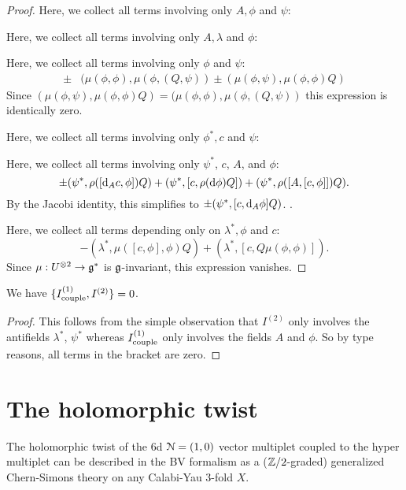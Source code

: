 \documentclass[10pt, oneside]{article}
\begin{document}
\begin{proof}
Here, we collect all terms involving only $A, \phi$ and $\psi$:

Here, we collect all terms involving only $A, \lambda$ and $\phi$:

Here, we collect all terms involving only $\phi$ and $\psi$:
\begin{align*}
\pm & (\mu(\phi, \phi) , \mu(\phi, (Q, \psi)) \pm (\mu(\phi, \psi), \mu(\phi,\phi)Q)
\end{align*}
Since $(\mu(\phi, \psi), \mu(\phi,\phi)Q) = (\mu(\phi, \phi) , \mu(\phi, (Q, \psi))$ this expression is identically zero. 

Here, we collect all terms involving only $\phi^*, c$ and $\psi$:


Here, we collect all terms involving only $\psi^*$, $c$, $A$, and $\phi$:
\[
\pm (\psi^*, \rho([{\rm d}_A c, \phi]) Q) + (\psi^*, [c, \rho({\rm d} \phi) Q]) + (\psi^*, \rho([A,[c,\phi]]) Q) .
\]
By the Jacobi identity, this simplifies to $\pm(\psi^*, [c, {\rm d}_A \phi] Q)$. .

Here, we collect all terms depending only on $\lambda^*, \phi$ and $c$:
\[
- (\lambda^*, \mu([c, \phi], \phi) Q) + (\lambda^*, [c, Q \mu(\phi,\phi)]) .
\]
Since $\mu : U^{\otimes 2} \to \mathfrak g^*$ is $\mathfrak g$-invariant, this expression vanishes. 
\end{proof}


\begin{lem} 
We have $\{I_{\rm couple}^{(1)}, I^{(2)}\} = 0$. 
\end{lem}
\begin{proof}
This follows from the simple observation that $I^{(2)}$ only involves the antifields $\lambda^*$, $\psi^*$ whereas $I^{(1)}_{\rm couple}$ only involves the fields $A$ and $\phi$.
So by type reasons, all terms in the bracket are zero.
\end{proof}

\section{The holomorphic twist}

The holomorphic twist of the 6d $\mathcal N=(1,0)$ vector multiplet coupled to the hyper multiplet can be described in the BV formalism as a ($\mathbb Z/2$-graded) generalized Chern-Simons theory on any Calabi-Yau $3$-fold $X$. 
\end{document}
